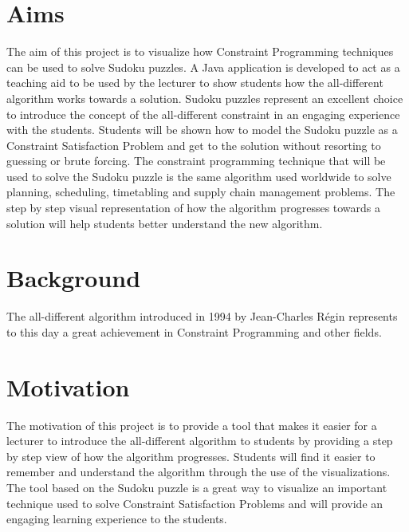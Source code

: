 \documentclass{l4proj}
\begin{document}
\section{Aims}
\noindent The aim of this project is to visualize how Constraint Programming techniques can be used to solve Sudoku puzzles. A Java application is developed to act as a teaching aid to be used by the lecturer to show students how the all-different algorithm works towards a solution. Sudoku puzzles represent an excellent choice to introduce the concept of the all-different constraint in an engaging experience with the students. Students will be shown how to model the Sudoku puzzle as a Constraint Satisfaction Problem and get to the solution without resorting to guessing or brute forcing. The constraint programming technique that will be used to solve the Sudoku puzzle is the same algorithm used worldwide to solve planning, scheduling, timetabling and supply chain management problems. The step by step visual representation of how the algorithm progresses towards a solution will help students better understand the new algorithm.

\section{Background}
The all-different algorithm introduced in 1994 by Jean-Charles R\'egin \cite{regin1994filtering} represents to this day a great achievement in Constraint Programming and other fields. 

\section{Motivation}
The motivation of this project is to provide a tool that makes it easier for a lecturer to introduce the all-different algorithm to students by providing a step by step view of how the algorithm progresses. Students will find it easier to remember and understand the algorithm through the use of the visualizations. The tool based on the Sudoku puzzle is a great way to visualize an important technique used to solve Constraint Satisfaction Problems and will provide an engaging learning experience to the students.
\end{document}
